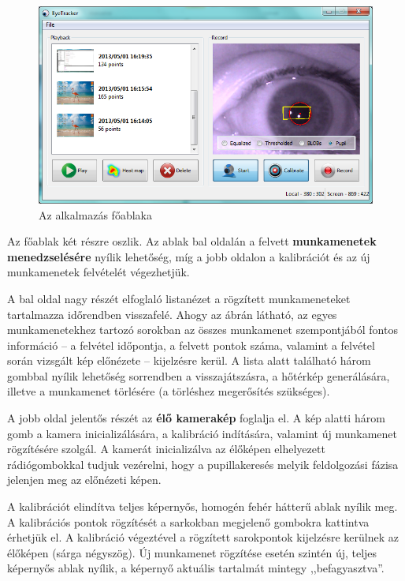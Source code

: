\begin{figure}[!ht]
\centering
\includegraphics[width=140mm, keepaspectratio]{figures/app_gui.png}
\caption{Az alkalmazás főablaka}
\label{fig:app_gui}
\end{figure}

\bigskip

Az főablak két részre oszlik. Az ablak bal oldalán a felvett \textbf{munkamenetek menedzselésére} nyílik lehetőség, míg a jobb oldalon a kalibrációt és az új munkamenetek felvételét végezhetjük.

A bal oldal nagy részét elfoglaló listanézet a rögzített munkameneteket tartalmazza időrendben visszafelé. Ahogy az ábrán látható, az egyes munkamenetekhez tartozó sorokban az összes munkamenet szempontjából fontos információ -- a felvétel időpontja, a felvett pontok száma, valamint a felvétel során vizsgált kép előnézete -- kijelzésre kerül. A lista alatt található három gombbal nyílik lehetőség sorrendben a visszajátszásra, a hőtérkép generálására, illetve a munkamenet törlésére (a törléshez megerősítés szükséges).

\bigskip

A jobb oldal jelentős részét az \textbf{élő kamerakép} foglalja el. A kép alatti három gomb a kamera inicializálására, a kalibráció indítására, valamint új munkamenet rögzítésére szolgál. A kamerát inicializálva az élőképen elhelyezett rádiógombokkal tudjuk vezérelni, hogy a pupillakeresés melyik feldolgozási fázisa jelenjen meg az előnézeti képen.

A kalibrációt elindítva teljes képernyős, homogén fehér hátterű ablak nyílik meg. A kalibrációs pontok rögzítését a sarkokban megjelenő gombokra kattintva érhetjük el. A kalibráció végeztével a rögzített sarokpontok kijelzésre kerülnek az élőképen (sárga négyszög). Új munkamenet rögzítése esetén szintén új, teljes képernyős ablak nyílik, a képernyő aktuális tartalmát mintegy ,,befagyasztva''.

